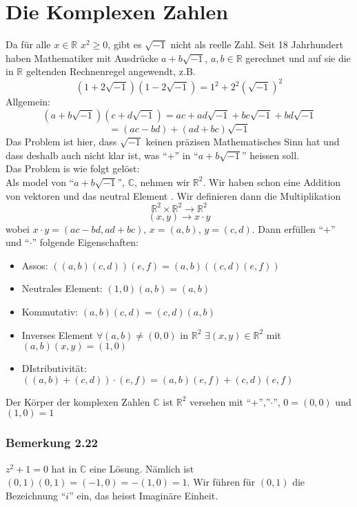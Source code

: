 \section{Die Komplexen Zahlen}
Da für alle $x\in\mathbb{R}$ $x^2\geq 0$, gibt es $\sqrt{-1}$ nicht als reelle Zahl. Seit 18 Jahrhundert haben Mathematiker mit Ausdrücke $a+b\sqrt{-1}$, $a,b\in\mathbb{R}$ gerechnet und auf sie die in $\mathbb{R}$ geltenden Rechnenregel angewendt, z.B. \[\left( 1+2\sqrt{-1}\right)\left( 1-2\sqrt{-1}\right) = 1^2 + 2^2\left( \sqrt{-1}\right)^2\]
Allgemein:
\[\left( a+b\sqrt{-1} \right)\left( c+d\sqrt{-1}\right) = ac + ad\sqrt{-1} + bc\sqrt{-1}+bd\sqrt{-1}\]
\[=\left( ac-bd\right)+\left(ad+bc\right)\sqrt{-1}\]
Das Problem ist hier, dass $\sqrt{-1}$ keinen präzisen Mathematisches Sinn hat und dass deshalb auch nicht klar ist, was ``$+$'' in ``$a+b\sqrt{-1}$'' heissen soll. \\

\noindent Das Problem is wie folgt gelöst:\\

Als model von ``$a+b\sqrt{-1}$'', $\mathbb{C}$, nehmen wir $\mathbb{R}^2$. Wir haben schon eine Addition von vektoren und das neutral Element . Wir definieren dann die Multiplikation \[\mathbb{R}^2 \times\mathbb{R}^2 \rightarrow \mathbb{R}^2\] \[(x,y)\rightarrow x\cdot y \]
wobei $x\cdot y=(ac-bd,ad+bc)$, $x=(a,b)$, $y=(c,d)$. Dann erfüllen ``$+$'' und ``$\cdot$'' folgende Eigenschaften:
\begin{itemize}
\item Assos: $\left((a,b)(c,d)\right)(e,f)=(a,b)\left((c,d)(e,f) \right)$
\item Neutrales Element: $(1,0)(a,b)=(a,b)$
\item Kommutativ: $(a,b)(c,d)=(c,d)(a,b)$
\item Inverses Element $\forall (a,b)\not = (0,0)$ in $\mathbb{R}^2$ $\exists(x,y)\in\mathbb{R}^2$ mit $(a,b)(x,y)=(1,0)$
\item DIstributivität: $\left( (a,b)+(c,d)\right)\cdot (e,f)=(a,b)(e,f)+(c,d)(e,f)$
\end{itemize}

\begin{definition}{2.21}
Der Körper der komplexen Zahlen $\mathbb{C}$ ist $\mathbb{R}^2$ versehen mit ``$+$'',''$\cdot$'', $0=(0,0)$ und $(1,0)=1$
\end{definition}

\subsubsection*{Bemerkung 2.22}
$z^2+1=0$ hat in $\mathbb{C}$ eine Lösung. Nämlich ist $(0,1)(0,1)=(-1,0)=-(1,0)=1$. Wir führen für $(0,1)$ die Bezeichnung ``$i$'' ein, das heisst Imaginäre Einheit.\\

